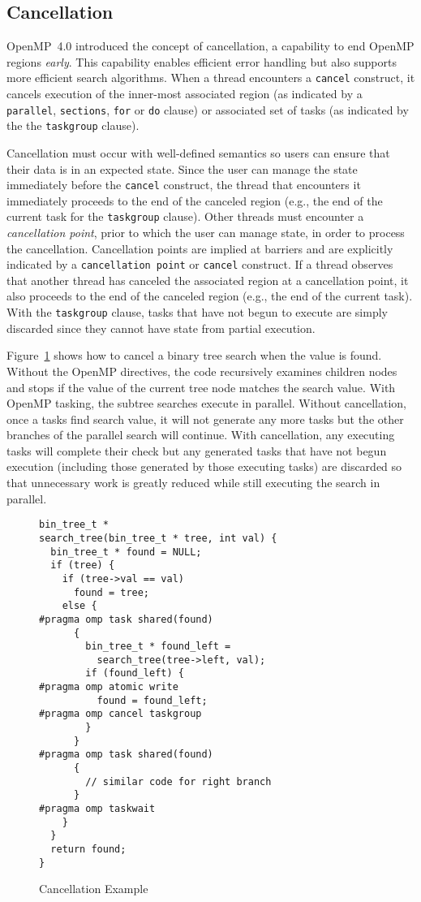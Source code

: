 \subsection{Cancellation}
\label{sec:Cancellation}
OpenMP~4.0 introduced the concept of cancellation, a capability to end 
OpenMP regions \emph{early}. This capability enables efficient error
handling but also supports more efficient search algorithms. When a thread
encounters a \texttt{cancel} construct, it cancels execution of the 
inner-most associated region (as indicated by a \texttt{parallel}, 
\texttt{sections}, \texttt{for} or \texttt{do} clause) or associated set 
of tasks (as indicated by the the \texttt{taskgroup} clause). 

Cancellation must occur with well-defined semantics so users can ensure 
that their data is in an expected state. Since the user can manage the 
state immediately before the \texttt{cancel} construct, the thread 
that encounters it immediately proceeds to the end of the canceled region 
(e.g., the end of the current task for the \texttt{taskgroup} clause). Other
threads must encounter a \emph{cancellation point}, prior to which the user 
can manage state, in order to process the cancellation. Cancellation points 
are implied at barriers and are explicitly indicated by a 
\texttt{cancellation point} or \texttt{cancel} construct. If a thread observes 
that another thread has canceled the associated region at a cancellation point,
it also proceeds to the end of the canceled region (e.g., the end of the 
current task). With the \texttt{taskgroup} clause, tasks that have not begun
to execute are simply discarded since they cannot have state from partial 
execution.

Figure~\ref{fig:Cancellation} shows how to cancel a binary tree search when 
the value is found. Without the OpenMP directives, the code recursively 
examines children nodes and stops if the value of the current tree node 
matches the search value. With OpenMP tasking, the subtree searches execute
in parallel. Without cancellation, once a tasks find search value, it will 
not generate any more tasks but the other branches of the parallel search 
will continue. With cancellation, any executing tasks will complete their 
check but any generated tasks that have not begun execution (including those 
generated by those executing tasks) are discarded so that unnecessary work 
is greatly reduced while still executing the search in parallel.

\begin{figure}
\begin{verbatim}
bin_tree_t *
search_tree(bin_tree_t * tree, int val) {
  bin_tree_t * found = NULL;
  if (tree) {
    if (tree->val == val)
      found = tree;
    else {
#pragma omp task shared(found)
      {
        bin_tree_t * found_left =
          search_tree(tree->left, val);
        if (found_left) {
#pragma omp atomic write
          found = found_left;
#pragma omp cancel taskgroup
        }
      }
#pragma omp task shared(found)
      {
        // similar code for right branch
      }
#pragma omp taskwait
    }
  }
  return found;
}
\end{verbatim}
\caption{Cancellation Example\label{fig:Cancellation}}
\end{figure}


